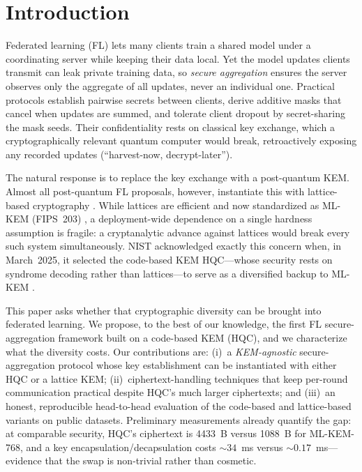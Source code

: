 \documentclass[conference]{IEEEtran}
\begin{document}
\section{Introduction}
Federated learning (FL) lets many clients train a shared model under a coordinating
server while keeping their data local. Yet the model updates clients transmit can leak
private training data, so \emph{secure aggregation} ensures the server observes only the
aggregate of all updates, never an individual one. Practical protocols establish pairwise
secrets between clients, derive additive masks that cancel when updates are summed, and
tolerate client dropout by secret-sharing the mask seeds. Their confidentiality rests on
classical key exchange, which a cryptographically relevant quantum computer would break,
retroactively exposing any recorded updates (``harvest-now, decrypt-later'').

The natural response is to replace the key exchange with a post-quantum KEM. Almost all
post-quantum FL proposals, however, instantiate this with lattice-based cryptography
\cite{pqsf2024,qinxu2025,narsimhulu2026,nguyen2025lattice}. While lattices are efficient
and now standardized as ML-KEM (FIPS~203) \cite{fips203}, a deployment-wide dependence on
a single hardness assumption is fragile: a cryptanalytic advance against lattices would
break every such system simultaneously. NIST acknowledged exactly this concern when, in
March~2025, it selected the code-based KEM HQC---whose security rests on syndrome decoding
rather than lattices---to serve as a diversified backup to ML-KEM \cite{nistir8545}.

This paper asks whether that cryptographic diversity can be brought into federated
learning. We propose, to the best of our knowledge, the first FL secure-aggregation
framework built on a code-based KEM (HQC), and we characterize what the diversity costs.
Our contributions are: (i)~a \emph{KEM-agnostic} secure-aggregation protocol whose key
establishment can be instantiated with either HQC or a lattice KEM; (ii)~ciphertext-handling
techniques that keep per-round communication practical despite HQC's much larger
ciphertexts; and (iii)~an honest, reproducible head-to-head evaluation of the code-based
and lattice-based variants on public datasets. Preliminary measurements already quantify
the gap: at comparable security, HQC's ciphertext is 4433~B versus 1088~B for ML-KEM-768,
and a key encapsulation/decapsulation costs ${\sim}34$~ms versus ${\sim}0.17$~ms---evidence
that the swap is non-trivial rather than cosmetic.
\end{document}
